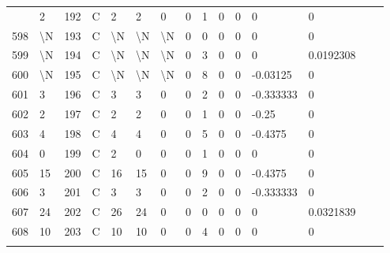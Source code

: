\begin{longtable}{lllllllllllllll}
\begin{comment}
	597 & 2                 & 192 & C   & 2                 & 2                 & 0                 & 0    & 1          & 0              & 0              & 0             & 0            \\
	598 & \textbackslash{}N & 193 & C   & \textbackslash{}N & \textbackslash{}N & \textbackslash{}N & 0    & 0          & 0              & 0              & 0             & 0            \\
	599 & \textbackslash{}N & 194 & C   & \textbackslash{}N & \textbackslash{}N & \textbackslash{}N & 0    & 3          & 0              & 0              & 0             & 0.0192308    \\
	600 & \textbackslash{}N & 195 & C   & \textbackslash{}N & \textbackslash{}N & \textbackslash{}N & 0    & 8          & 0              & 0              & -0.03125      & 0            \\
	601 & 3                 & 196 & C   & 3                 & 3                 & 0                 & 0    & 2          & 0              & 0              & -0.333333     & 0            \\
	602 & 2                 & 197 & C   & 2                 & 2                 & 0                 & 0    & 1          & 0              & 0              & -0.25         & 0            \\
	603 & 4                 & 198 & C   & 4                 & 4                 & 0                 & 0    & 5          & 0              & 0              & -0.4375       & 0            \\
	604 & 0                 & 199 & C   & 2                 & 0                 & 0                 & 0    & 1          & 0              & 0              & 0             & 0            \\
	605 & 15                & 200 & C   & 16                & 15                & 0                 & 0    & 9          & 0              & 0              & -0.4375       & 0            \\
	606 & 3                 & 201 & C   & 3                 & 3                 & 0                 & 0    & 2          & 0              & 0              & -0.333333     & 0            \\
	607 & 24                & 202 & C   & 26                & 24                & 0                 & 0    & 0          & 0              & 0              & 0             & 0.0321839    \\
	608 & 10                & 203 & C   & 10                & 10                & 0                 & 0    & 4          & 0              & 0              & 0             & 0            \\

\end{comment}
\end{longtable}
